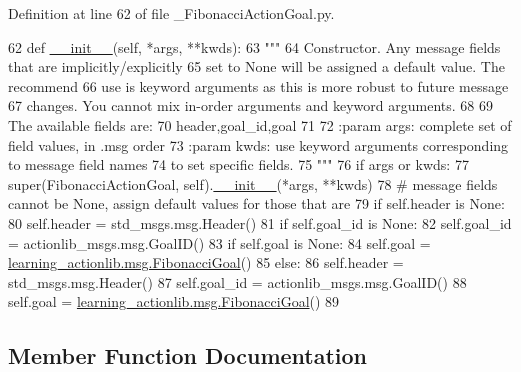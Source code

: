 Definition at line 62 of file \+\_\+\+Fibonacci\+Action\+Goal.\+py.


\begin{DoxyCode}
62   \textcolor{keyword}{def }\hyperlink{classstate__machine_1_1Play_a5993a23d8be7f7b2647f71ede0334957}{\_\_init\_\_}(self, *args, **kwds):
63     \textcolor{stringliteral}{"""}
64 \textcolor{stringliteral}{    Constructor. Any message fields that are implicitly/explicitly}
65 \textcolor{stringliteral}{    set to None will be assigned a default value. The recommend}
66 \textcolor{stringliteral}{    use is keyword arguments as this is more robust to future message}
67 \textcolor{stringliteral}{    changes.  You cannot mix in-order arguments and keyword arguments.}
68 \textcolor{stringliteral}{}
69 \textcolor{stringliteral}{    The available fields are:}
70 \textcolor{stringliteral}{       header,goal\_id,goal}
71 \textcolor{stringliteral}{}
72 \textcolor{stringliteral}{    :param args: complete set of field values, in .msg order}
73 \textcolor{stringliteral}{    :param kwds: use keyword arguments corresponding to message field names}
74 \textcolor{stringliteral}{    to set specific fields.}
75 \textcolor{stringliteral}{    """}
76     \textcolor{keywordflow}{if} args \textcolor{keywordflow}{or} kwds:
77       super(FibonacciActionGoal, self).\hyperlink{classstate__machine_1_1Play_a5993a23d8be7f7b2647f71ede0334957}{\_\_init\_\_}(*args, **kwds)
78       \textcolor{comment}{# message fields cannot be None, assign default values for those that are}
79       \textcolor{keywordflow}{if} self.header \textcolor{keywordflow}{is} \textcolor{keywordtype}{None}:
80         self.header = std\_msgs.msg.Header()
81       \textcolor{keywordflow}{if} self.goal\_id \textcolor{keywordflow}{is} \textcolor{keywordtype}{None}:
82         self.goal\_id = actionlib\_msgs.msg.GoalID()
83       \textcolor{keywordflow}{if} self.goal \textcolor{keywordflow}{is} \textcolor{keywordtype}{None}:
84         self.goal = \hyperlink{classlearning__actionlib_1_1msg_1_1__FibonacciGoal_1_1FibonacciGoal}{learning\_actionlib.msg.FibonacciGoal}()
85     \textcolor{keywordflow}{else}:
86       self.header = std\_msgs.msg.Header()
87       self.goal\_id = actionlib\_msgs.msg.GoalID()
88       self.goal = \hyperlink{classlearning__actionlib_1_1msg_1_1__FibonacciGoal_1_1FibonacciGoal}{learning\_actionlib.msg.FibonacciGoal}()
89 
\end{DoxyCode}


\subsection{Member Function Documentation}
\mbox{\label{classlearning__actionlib_1_1msg_1_1__FibonacciActionGoal_1_1FibonacciActionGoal_a8af97ef9ddbee3c082a481aa20cdc44e}} 
